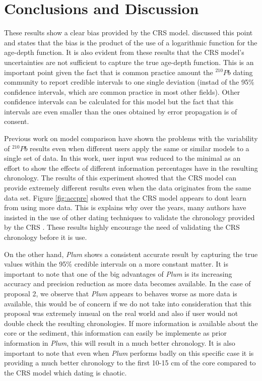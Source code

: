\documentclass [10pt] {article}
\begin{document}
\section{Conclusions and Discussion}

These results show a clear bias provided by the CRS model. 
\citet{Aquino2018} discussed this point and states that the bias is the product of the use of a logarithmic function for the age-depth function. 
It is also evident from these results that the CRS model's uncertainties are not sufficient to capture the true age-depth function. 
This is an important point given the fact that is common practice amount the $^{210}Pb$ dating community to report credible intervals to one single deviation (instad of the 95\% confidence intervals, which are common practice in most other fields).
Other confidence intervals can be calculated for this model \citep{Sanchez-Cabeza2014} but the fact that this intervals are even smaller than the ones obtained by error propagation \citep{Appleby2001} is of consent. 

Previous work on model comparison \citep{Barsanti2020} have shown the problems with the variability of $^{210}Pb$ results even when different users apply the same or similar models to a single set of data.
In this work, user input was reduced to the minimal as an effort to show the effects of different information percentages have in the resulting chronology. 
The results of this experiment showed that the CRS model can provide extremely different results even when the data originates from the same data set. 
Figure \ref{fig:accpre} showed that the CRS model appears to dont learn from using more data.
This is explains why over the years, many authors have insisted in the use of other dating techniques to validate the chronology provided by the CRS \citep{Sanchez-Cabeza2012,Barsanti2020,Aquino2020}.
These results highly encourage the need of validating the CRS chronology before it is use.


On the other hand, \textit{Plum} shows a consistent accurate result by capturing the true values within the 95\% credible intervals on a more constant matter. 
It is important to note that one of the big advantages of \textit{Plum} is its increasing accuracy and precision reduction as more data becomes available.
In the case of proposal 2, we observe that \textit{Plum} appears to behaves worse as more data is available, this would be of concern if we do not take into consideration that this proposal was extremely inusual on the real world and also if user would not double check the resulting chronologies. 
If more information is available about the core or the sediment, this information can easily be implemente as prior information in \textit{Plum}, this will result in a much better chronology.
It is also important to note that even when \textit{Plum} performs badly on this specific case it is providing a much better chronology to the first 10-15 cm of the core compared to the CRS model which dating is chaotic.
\end{document}
